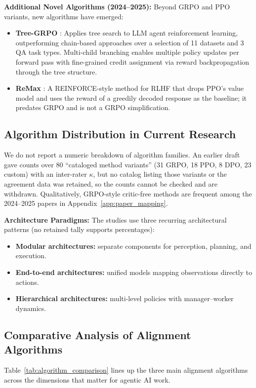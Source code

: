\documentclass[12pt,a4paper]{report}
\theoremstyle{definition}
\begin{document}
\noindent\textbf{Additional Novel Algorithms (2024--2025):} Beyond GRPO and PPO variants, new algorithms have emerged:
\begin{itemize}
    \item \textbf{Tree-GRPO} \cite{ji2025treegrpo}: Applies tree search to LLM agent reinforcement learning, outperforming chain-based approaches over a selection of 11 datasets and 3 QA task types.
 Multi-child branching enables multiple policy updates per forward pass with fine-grained credit assignment via reward backpropagation through the tree structure.

    \item \textbf{ReMax} \cite{li2024remax}: A REINFORCE-style method for RLHF that drops PPO's value model and uses the reward of a greedily decoded response as the baseline; it predates GRPO and is not a GRPO simplification.
\end{itemize}

\subsection{Algorithm Distribution in Current Research}
We do not report a numeric breakdown of algorithm families. An earlier draft gave counts over 80 ``cataloged method variants'' (31 GRPO, 18 PPO, 8 DPO, 23 custom) with an inter-rater $\kappa$, but no catalog listing those variants or the agreement data was retained, so the counts cannot be checked and are withdrawn. Qualitatively, GRPO-style critic-free methods are frequent among the 2024--2025 papers in Appendix~\ref{app:paper_mapping}.

\noindent\textbf{Architecture Paradigms:} The studies use three recurring architectural patterns (no retained tally supports percentages):
\begin{itemize}
    \item \textbf{Modular architectures:} separate components for perception, planning, and execution.
    \item \textbf{End-to-end architectures:} unified models mapping observations directly to actions.
    \item \textbf{Hierarchical architectures:} multi-level policies with manager--worker dynamics.
\end{itemize}

\subsection{Comparative Analysis of Alignment Algorithms}
Table~\ref{tab:algorithm_comparison} lines up the three main alignment algorithms across the dimensions that matter for agentic AI work.
\end{document}
